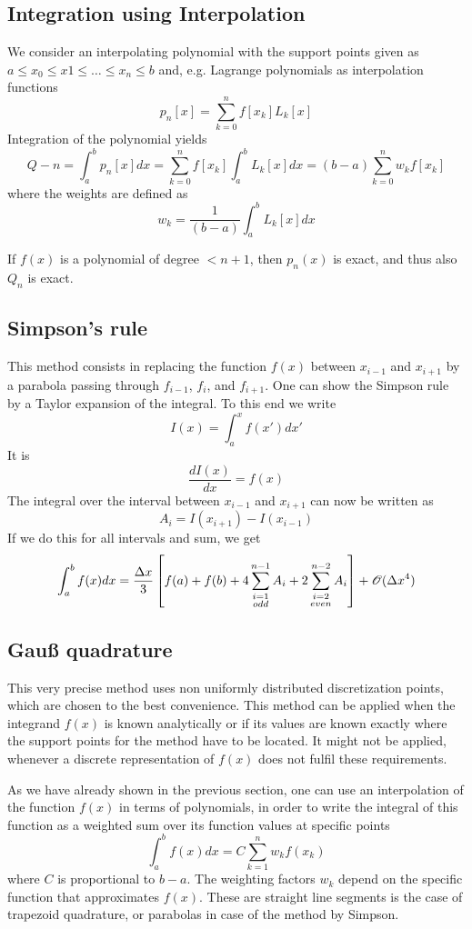 \subsection{Integration using Interpolation}
We consider an interpolating polynomial with the support points given as
$a\le x_0\le x1\le\dots\le x_n\le b$
and, e.g. Lagrange polynomials as interpolation functions
\[ p_n[x]=\sum_{k=0}^nf[x_k]L_k[x]\]
Integration of the polynomial yields
\[ Q-n=\int_a^bp_n[x]dx=\sum_{k=0}^nf[x_k]\int_a^bL_k[x]dx=(b-a)\sum_{k=0}^nw_kf[x_k] \]
where the weights are defined as
\[ w_k=\frac{1}{(b-a)}\int_a^bL_k[x]dx\]

\begin{note}{}
If $f(x)$ is a polynomial of degree $<n+1$, then $p_n(x)$ is exact, and thus
also $Q_n$ is exact.
\end{note}
\subsection{Simpson's rule}
This method consists in replacing the function $f(x)$ between $x_{i-1}$ and
$x_{i+1}$ by a parabola passing through $f_{i-1}$, $f_i$, and $f_{i+1}$. One
can show the Simpson rule by a Taylor expansion of the integral. To this end we
write
\[ I(x)=\int_a^x f(x')dx'\]
It is
\[ \frac{dI(x)}{dx}=f(x)\]
The integral over the interval between $x_{i-1}$ and $x_{i+1}$ can now be written as
\[ A_i =I(x_{i+1})-I(x_{i-1})\]
If we do this for all intervals and sum, we get
\[\int_a^bf(x)dx=\frac{\Delta x}{3} \left[
f(a)+f(b)+4 \sum_{\substack{i=1\\ odd}}^{n-1} 
A_i+2 \sum_{\substack{i=2 \\ even}}^{n-2}A_i\right]+{\cal O}(\Delta x^4)\]

\subsection{Gau{\ss} quadrature}
This very precise method uses non uniformly distributed discretization points,
which are chosen to the best convenience. This method can be applied when the
integrand $f(x)$ is known analytically or if its values are known exactly where
the support points for the method have to be located. It might not be applied,
whenever a discrete representation of $f(x)$ does not fulfil these
requirements.

As we have already shown in the previous section, one can use an interpolation
of the function $f(x)$ in terms of polynomials, in order to write the integral
of this function as a weighted sum over its function values at specific points
\[ \int_{a}^{b}f(x)dx=C\sum_{k=1}^nw_kf(x_k)\]
where $C$ is proportional to $b-a$. The weighting factors $w_k$ depend on the
specific function that approximates $f(x)$. These are straight line segments is
the case of trapezoid quadrature, or parabolas in case of the method by
Simpson.

